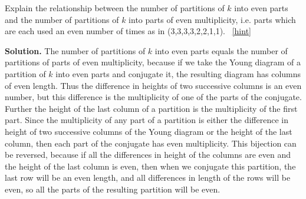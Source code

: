 \documentclass{book}
\begin{document}
\setcounter{project}{306}
\addtocounter{project}{-1}
\begin{activity}[]\label{partition-even-mult-even-use}
\hypertarget{p-1562}{}%
Explain the relationship between the number of partitions of \(k\) into even parts and the number of partitions of \(k\) into parts of even multiplicity, i.e. parts which are each used an even number of times as in (3,3,3,3,2,2,1,1).%
~\hfill{\tiny\hyperlink{a-306}{[hint]}\hypertarget{q-306}{}}\par\smallskip%
\noindent\textbf{Solution.}\hypertarget{solution-220}{}\quad%
\hypertarget{p-1564}{}%
The number of partitions of \(k\) into even parts equals the number of partitions of parts of even multiplicity, because if we take the Young diagram of a partition of \(k\) into even parts and conjugate it, the resulting diagram has columns of even length. Thus the difference in heights of two successive columns is an even number, but this difference is the multiplicity of one of the parts of the conjugate. Further the height of the last column of a partition is the multiplicity of the first part. Since the multiplicity of any part of a partition is either the difference in height of two successive columns of the Young diagram or the height of the last column, then each part of the conjugate has even multiplicity. This bijection can be reversed, because if all the differences in height of the columns are even and the height of the last column is even, then when we conjugate this partition, the last row will be an even length, and all differences in length of the rows will be even, so all the parts of the resulting partition will be even.%
\end{activity}
\end{document}
